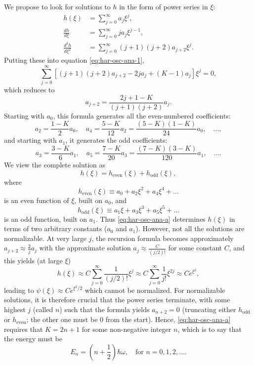 \documentclass{article}
\begin{document}
We propose to look for solutions to $h$ in the form of power series in $\xi$:
\begin{align*}
  h(\xi) &= \sum_{j=0}^{\infty} a_j\xi^j, \\
  \frac{dh}{d\xi} &= \sum_{j=0}^{\infty} ja_j\xi^{j-1}, \\
  \frac{d^2h}{d\xi^2} &= \sum_{j=0}^{\infty} (j+1)(j+2)a_{j+2}\xi^j.
\end{align*}
Putting these into equation \eqref{eq:har-osc-ana-1}, \[
  \sum_{j=0}^{\infty} [(j+1)(j+2)a_{j+2} - 2ja_j + (K - 1)a_j]\xi^j = 0,
\] which reduces to
\begin{equation} \label{eq:har-osc-ana-a}
  a_{j+2} = \frac{2j + 1 - K}{(j+1)(j+2)}a_j.
\end{equation}
Starting with $a_0$, this formula generates all the even-numbered coefficients:
\[
  a_2 = \frac{1 - K}{2}a_0, \quad
  a_4 = \frac{5 - K}{12}a_2 = \frac{(5 - K)(1 - K)}{24}a_0, \quad
  \ldots,
\] and starting with $a_1$, it generates the odd coefficients: \[
  a_3 = \frac{3 - K}{6}a_1, \quad
  a_5 = \frac{7 - K}{20}a_3 = \frac{(7 - K)(3 - K)}{120}a_1, \quad
  \ldots.
\] We view the complete solution as
\begin{equation} \label{eq:har-osc-ana-h-2}
  h(\xi) = h_{\mathrm{even}}(\xi) + h_{\mathrm{odd}}(\xi),
\end{equation} where \[
  h_{\mathrm{even}}(\xi) \equiv a_0 + a_2\xi^2 + a_4\xi^4 + \ldots
\] is an even function of $\xi$, built on $a_0$, and \[
h_{\mathrm{odd}}(\xi) \equiv a_1\xi + a_3\xi^3 + a_5\xi^5 + \ldots
\] is an odd function, built on $a_1$. Thus \eqref{eq:har-osc-ana-a} determines
$h(\xi)$ in terms of two arbitrary constants ($a_0$ and $a_1$). However, not
all the solutions are normalizable. At very large $j$, the recursion formula
becomes approximately $a_{j+2} \approx \frac{2}{j}a_j$ with the approximate
solution $a_j \approx \frac{C}{(j/2)!}$ for some constant $C$, and this yields
(at large $\xi$) \[
  h(\xi)
  \approx C\sum_{j=0}^{\infty} \frac{1}{(j/2)!}\xi^j
  \approx C\sum_{j=0}^{\infty} \frac{1}{j!}\xi^{2j}
  \approx Ce^{\xi^2},
\] leading to $\psi(\xi) \approx Ce^{\xi^2/2}$ which cannot be normalized. For
normalizable solutions, it is therefore crucial that the power series
terminate, with some highest $j$ (called $n$) such that the formula yields
$a_{n+2} = 0$ (truncating either $h_{\mathrm{odd}}$ or $h_{\mathrm{even}}$; the
other one must be 0 from the start). Hence, \eqref{eq:har-osc-ana-a} requires
that $K = 2n + 1$ for some non-negative integer $n$, which is to say that the
energy must be
\begin{equation} \label{eq:har-osc-ana-ene}
  E_n = \left(n + \frac{1}{2}\right)\hbar\omega, \quad
  \text{for } n = 0, 1, 2, \ldots.
\end{equation}
\end{document}
